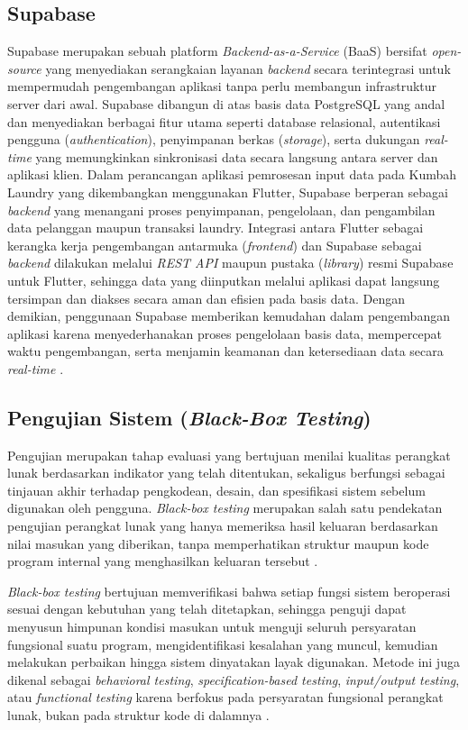 \subsection{Supabase}
Supabase merupakan sebuah platform \textit{Backend-as-a-Service} (BaaS) bersifat \textit{open-source} yang menyediakan serangkaian layanan \textit{backend} secara terintegrasi untuk mempermudah pengembangan aplikasi tanpa perlu membangun infrastruktur server dari awal. Supabase dibangun di atas basis data PostgreSQL yang andal dan menyediakan berbagai fitur utama seperti database relasional, autentikasi pengguna (\textit{authentication}), penyimpanan berkas (\textit{storage}), serta dukungan \textit{real-time} yang memungkinkan sinkronisasi data secara langsung antara server dan aplikasi klien. Dalam perancangan aplikasi pemrosesan input data pada Kumbah Laundry yang dikembangkan menggunakan Flutter, Supabase berperan sebagai \textit{backend} yang menangani proses penyimpanan, pengelolaan, dan pengambilan data pelanggan maupun transaksi laundry. Integrasi antara Flutter sebagai kerangka kerja pengembangan antarmuka (\textit{frontend}) dan Supabase sebagai \textit{backend} dilakukan melalui \textit{REST API} maupun pustaka (\textit{library}) resmi Supabase untuk Flutter, sehingga data yang diinputkan melalui aplikasi dapat langsung tersimpan dan diakses secara aman dan efisien pada basis data. Dengan demikian, penggunaan Supabase memberikan kemudahan dalam pengembangan aplikasi karena menyederhanakan proses pengelolaan basis data, mempercepat waktu pengembangan, serta menjamin keamanan dan ketersediaan data secara \textit{real-time} \cite{Murizar2025}.

\subsection{Pengujian Sistem (\textit{Black-Box Testing})}
\label{subsec:blackbox-testing}
Pengujian merupakan tahap evaluasi yang bertujuan menilai kualitas perangkat lunak berdasarkan indikator yang telah ditentukan, sekaligus berfungsi sebagai tinjauan akhir terhadap pengkodean, desain, dan spesifikasi sistem sebelum digunakan oleh pengguna. \textit{Black-box testing} merupakan salah satu pendekatan pengujian perangkat lunak yang hanya memeriksa hasil keluaran berdasarkan nilai masukan yang diberikan, tanpa memperhatikan struktur maupun kode program internal yang menghasilkan keluaran tersebut \cite{Lubis_Ginting_2024}.

\textit{Black-box testing} bertujuan memverifikasi bahwa setiap fungsi sistem beroperasi sesuai dengan kebutuhan yang telah ditetapkan, sehingga penguji dapat menyusun himpunan kondisi masukan untuk menguji seluruh persyaratan fungsional suatu program, mengidentifikasi kesalahan yang muncul, kemudian melakukan perbaikan hingga sistem dinyatakan layak digunakan. Metode ini juga dikenal sebagai \textit{behavioral testing}, \textit{specification-based testing}, \textit{input/output testing}, atau \textit{functional testing} karena berfokus pada persyaratan fungsional perangkat lunak, bukan pada struktur kode di dalamnya \cite{Lubis_Ginting_2024}.

